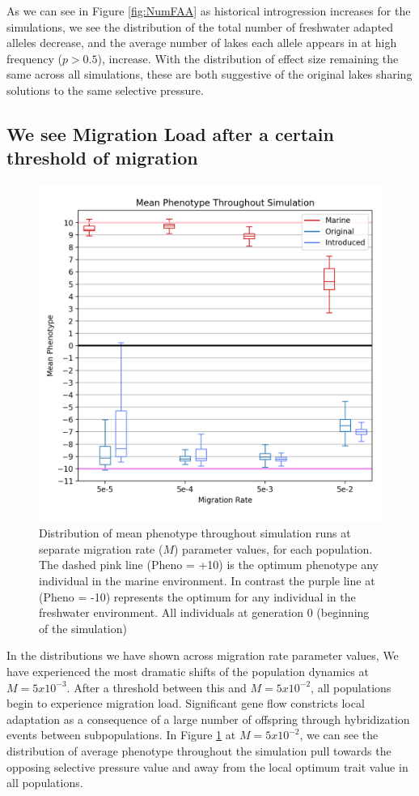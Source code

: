 \documentclass{article}
\begin{document}
As we can see in Figure \ref{fig:NumFAA}
as historical introgression increases for the simulations, 
we see the distribution of the total number of freshwater adapted alleles decrease, and 
the average number of lakes each allele appears in at high frequency ($p > 0.5$), increase.
With the distribution of effect size remaining the same across all simulations, 
these are both suggestive of the original lakes sharing solutions to the same selective pressure.



\subsection*{We see Migration Load after a certain threshold of migration}

\begin{figure}[h!tb]
	\begin{center}
  		\includegraphics[width=0.6\linewidth]{matplotlibPlots/MeanPhenotype1.png}
  		\caption{Distribution of mean phenotype throughout simulation runs at separate migration rate ($M$) parameter values, for each population.
		The dashed pink line (Pheno = +10) is the optimum phenotype any individual in the marine environment.
		In contrast the purple line at (Pheno = -10) represents the optimum for any individual in the freshwater environment. 
		All individuals at generation 0 (beginning of the simulation) 
		}
  		\label{fig:MeanPhenotype}
	\end{center}
\end{figure}


In the distributions we have shown across migration rate parameter values, 
We have experienced the most dramatic shifts of the population dynamics at $M = 5x10^{-3}$.
After a threshold between this and $M = 5x10^{-2}$, all populations begin to experience migration load. 
Significant gene flow constricts local adaptation
as a consequence of a large number of offspring through hybridization events between subpopulations.
In Figure \ref{fig:MeanPhenotype} at $M = 5x10^{-2}$, we can see the distribution of average phenotype throughout the simulation
pull towards the opposing selective pressure value and away from the local optimum trait value in all populations.
\end{document}
